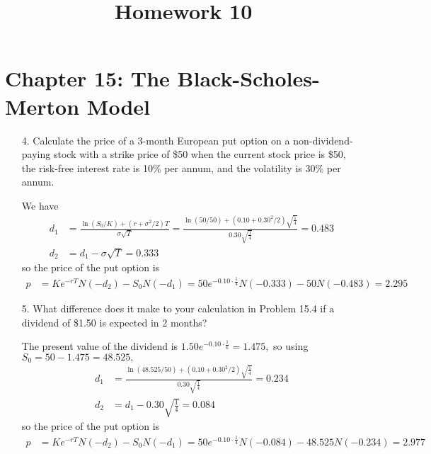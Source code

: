 \documentclass{article}
\begin{document}
\title{Homework 10}
\maketitle
\thispagestyle{fancy}

\section*{Chapter 15: The Black-Scholes-Merton Model}

\begin{itemize}
	\item[4.] Calculate the price of a 3-month European put option on a non-dividend-paying stock with a strike price of \$50 when the current stock price is \$50, the risk-free interest rate is 10\% per annum, and the volatility is 30\% per annum.
		\begin{soln}
			We have
			\begin{align*}
				d_1 &= \frac{\ln(S_0/K) + (r+\sigma^2/2)T}{\sigma\sqrt{T}} = \frac{\ln(50/50) + (0.10+0.30^2/2)\sqrt{\frac{1}{4}}}{0.30\sqrt{\frac{1}{4}}} = 0.483 \\
				d_2 &= d_1 - \sigma\sqrt{T} = 0.333
			\end{align*}
			so the price of the put option is
			\begin{align*}
				p &= Ke^{-rT}N(-d_2)-S_0N(-d_1) = 50e^{-0.10\cdot \frac{1}{4}}N(-0.333) - 50N(-0.483) = \boxed{2.295}
			\end{align*}
		\end{soln}

	\item[5.] What difference does it make to your calculation in Problem 15.4 if a dividend of \$1.50 is expected in 2 months?
		\begin{soln}
			The present value of the dividend is $1.50e^{-0.10\cdot \frac{1}{6}}=1.475,$ so using $S_0=50-1.475=48.525,$
			\begin{align*}
				d_1 &= \frac{\ln(48.525/50) + (0.10+0.30^2/2)\sqrt{\frac{1}{4}}}{0.30\sqrt{\frac{1}{4}}} = 0.234 \\ 
				d_2 &= d_1 - 0.30\sqrt{\frac{1}{4}} = 0.084
			\end{align*}
			so the price of the put option is
			\begin{align*}
				p &= Ke^{-rT}N(-d_2) - S_0N(-d_1) = 50e^{-0.10\cdot \frac{1}{4}} N(-0.084) - 48.525N(-0.234) = \boxed{2.977}
			\end{align*}
		\end{soln}


\end{itemize}
\end{document}
